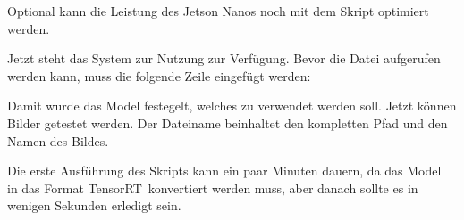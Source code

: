 \medskip

Optional kann die Leistung des Jetson Nanos noch mit dem Skript   optimiert werden.


\medskip



\medskip

Jetzt steht das System zur Nutzung zur Verfügung. Bevor die Datei  aufgerufen
werden kann, muss die folgende Zeile eingefügt werden:

\medskip


\medskip

Damit wurde das Model festegelt, welches zu verwendet werden soll. 
Jetzt können Bilder getestet werden. Der Dateiname \FILE{[image]} beinhaltet den kompletten
Pfad und den Namen  des Bildes.

\medskip


\medskip



Die erste Ausführung des Skripts kann ein paar Minuten dauern, da das Modell in das Format 
\glqq TensorRT\grqq\,  konvertiert werden muss, aber danach sollte es in wenigen Sekunden erledigt sein.


